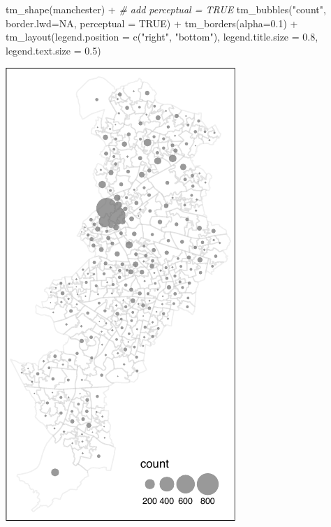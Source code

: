 \documentclass[
  krantz2]{krantz}
\makeatletter
\newenvironment{Shaded}{\begin{snugshade}}{\end{snugshade}}
\newcommand{\AttributeTok}[1]{\textcolor[rgb]{0.61,0.61,0.61}{#1}}
\newcommand{\CommentTok}[1]{\textcolor[rgb]{0.37,0.37,0.37}{\textit{#1}}}
\newcommand{\ConstantTok}[1]{\textcolor[rgb]{0,0,0}{#1}}
\newcommand{\FloatTok}[1]{\textcolor[rgb]{0.06,0.06,0.06}{#1}}
\newcommand{\FunctionTok}[1]{\textcolor[rgb]{0,0,0}{#1}}
\newcommand{\NormalTok}[1]{#1}
\newcommand{\SpecialCharTok}[1]{\textcolor[rgb]{0,0,0}{#1}}
\newcommand{\StringTok}[1]{\textcolor[rgb]{0.5,0.5,0.5}{#1}}
\newenvironment{kframe}{%
\medskip{}
\setlength{\fboxsep}{.8em}
 \def\at@end@of@kframe{}%
 \ifinner\ifhmode%
  \def\at@end@of@kframe{\end{minipage}}%
  \begin{minipage}{\columnwidth}%
 \fi\fi%
 \def\FrameCommand##1{\hskip\@totalleftmargin \hskip-\fboxsep
 \colorbox{shadecolor}{##1}\hskip-\fboxsep
     \hskip-\linewidth \hskip-\@totalleftmargin \hskip\columnwidth}%
 \MakeFramed {\advance\hsize-\width
   \@totalleftmargin\z@ \linewidth\hsize
   \@setminipage}}%
 {\par\unskip\endMakeFramed%
 \at@end@of@kframe}
\renewenvironment{Shaded}{\begin{kframe}}{\end{kframe}}
\makeatother
\begin{document}
\begin{Shaded}
\begin{Highlighting}[]
\FunctionTok{tm\_shape}\NormalTok{(manchester) }\SpecialCharTok{+}  
  \CommentTok{\# add perceptual = TRUE}
  \FunctionTok{tm\_bubbles}\NormalTok{(}\StringTok{"count"}\NormalTok{, }\AttributeTok{border.lwd=}\ConstantTok{NA}\NormalTok{, }\AttributeTok{perceptual =} \ConstantTok{TRUE}\NormalTok{) }\SpecialCharTok{+} 
  \FunctionTok{tm\_borders}\NormalTok{(}\AttributeTok{alpha=}\FloatTok{0.1}\NormalTok{) }\SpecialCharTok{+}                           
  \FunctionTok{tm\_layout}\NormalTok{(}\AttributeTok{legend.position =} \FunctionTok{c}\NormalTok{(}\StringTok{"right"}\NormalTok{, }\StringTok{"bottom"}\NormalTok{), }
            \AttributeTok{legend.title.size =} \FloatTok{0.8}\NormalTok{, }\AttributeTok{legend.text.size =} \FloatTok{0.5}\NormalTok{)}
\end{Highlighting}
\end{Shaded}

\includegraphics{crime_mapping_files/figure-latex/unnamed-chunk-80-1.pdf}
\end{document}
